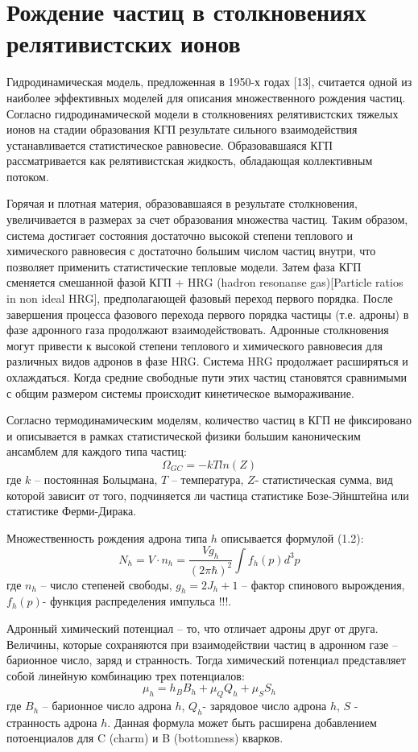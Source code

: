 \section{Рождение частиц в столкновениях релятивистских ионов}

Гидродинамическая модель, предложенная в 1950-х годах [13], считается одной из наиболее эффективных моделей для описания множественного рождения частиц.
Согласно гидродинамической модели в столкновениях релятивистских тяжелых ионов   на стадии образования КГП результате сильного взаимодействия устанавливается статистическое равновесие. Образовавшаяся КГП рассматривается как релятивистская жидкость, обладающая коллективным потоком.

Горячая и плотная материя, образовавшаяся в результате столкновения, увеличивается в размерах за счет образования множества частиц.
Таким образом, система достигает состояния достаточно высокой степени теплового и химического равновесия с достаточно большим числом частиц внутри, что позволяет применить статистические тепловые модели.
Затем фаза КГП сменяется смешанной фазой КГП + HRG (hadron resonanse gas)[Particle ratios in non ideal HRG], предполагающей фазовый переход первого порядка. После завершения процесса фазового перехода первого порядка частицы (т.е. адроны) в фазе адронного газа продолжают взаимодействовать. Адронные столкновения могут привести к высокой степени теплового и химического равновесия для различных видов адронов в фазе HRG. Система HRG продолжает расширяться и охлаждаться. Когда средние свободные пути этих частиц становятся сравнимыми с общим размером системы происходит кинетическое вымораживание.

Согласно термодинамическим моделям, количество частиц в КГП не фиксировано и описывается в рамках статистической физики большим каноническим ансамблем для каждого типа частиц:
$$\Omega_{GC} = -kT ln(Z)$$
где $k$ – постоянная Больцмана, 
$T$ – температура, 
$Z$- статистическая сумма, вид которой зависит от того, подчиняется ли частица статистике Бозе-Эйнштейна или статистике Ферми-Дирака.

Множественность рождения адрона типа $h$ описывается формулой (1.2):
$$ N_h = V\cdot n_h = \frac{V g_h}{(2 \pi \hbar)^2} \int f_h(p)d^3p$$
где $n_h$ – число степеней свободы,
$g_h=2J_h+1$ – фактор спинового вырождения,
$f_h(p)$- функция распределения импульса !!!.

Адронный химический потенциал – то, что отличает адроны друг от друга. Величины, которые сохраняются при взаимодействии частиц в адронном газе – барионное число, заряд и странность. Тогда химический потенциал представляет собой линейную комбинацию трех потенциалов:
$$\mu_h=h_B B_h + \mu_Q Q_h + \mu_S S_h$$
где $B_h$ – барионное число адрона $h$, 
$Q_h$- зарядовое число адрона $h$, 
$S$ -  странность адрона $h$.
Данная формула может быть расширена добавлением потоенциалов для C (charm) и B (bottomness) кварков.

